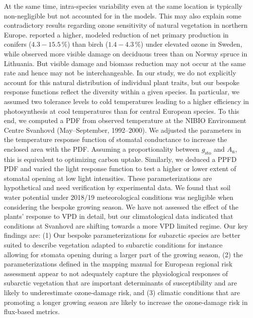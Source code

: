 \documentclass[bg, manuscript]{copernicus}
\begin{document}
At the same time, intra-species variability even at the same location is typically non-negligible \citep{EP:Bassin2004,Amb:Girgzdiene2009} but not accounted for in the models. This may also explain some contradictory results regarding ozone sensitivity of natural vegetation in northern Europe. \citet{FS:Subramanian2014} reported a higher, modeled reduction of net primary production in conifers ($4.3-15.5\,\unit{\%}$) than birch ($1.4-4.3\,\unit{\%}$) under elevated ozone in Sweden, while \citet{Amb:Girgzdiene2009} observed more visible damage on deciduous trees than on Norway spruce in Lithuania. But visible damage and biomass reduction may not occur at the same rate and hence may not be interchangeable. In our study, we do not explicitly account for this natural distribution of individual plant traits, but our bespoke response functions reflect the diversity within a given species. In particular, we assumed two tolerance levels to cold temperatures leading to a higher efficiency in photosynthesis at cool temperatures than for central European species. To this end, we computed a PDF from observed temperature at the NIBIO Environment Centre Svanhovd (May--September, 1992--2000). We adjusted the parameters in the temperature response function of stomatal conductance to increase the enclosed area with the PDF. Assuming a proportionality between $g_\mathrm{sto}$ and $A_\mathrm{n}$, this is equivalent to optimizing carbon uptake. Similarly, we deduced a PPFD PDF and varied the light response function to test a higher or lower extent of stomatal opening at low light intensities. These parameterizations are hypothetical and need verification by experimental data. We found that soil water potential under 2018/19 meteorological conditions was negligible when considering the bespoke growing season. We have not assessed the effect of the plants' response to VPD in detail, but our climatological data indicated that conditions at Svanhovd are shifting towards a more VPD limited regime. Our key findings are: (1) Our bespoke parameterizations for subarctic species are better suited to describe vegetation adapted to subarctic conditions for instance allowing for stomata opening during a larger part of the growing season, (2) the parameterizations defined in the mapping manual for European regional risk assessment appear to not adequately capture the physiological responses of subarctic vegetation that are important determinants of \chem{[O_3]} susceptibility and are likely to underestimate ozone-damage risk, and (3) climatic conditions that are promoting a longer growing season are likely to increase the ozone-damage risk in flux-based metrics.
\end{document}
